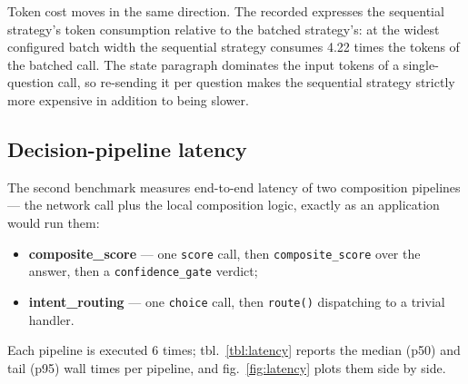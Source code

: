 \documentclass[
  english,
]{article}
\providecommand{\tightlist}{%
  \setlength{\itemsep}{0pt}\setlength{\parskip}{0pt}}
\begin{document}
Token cost moves in the same direction. The recorded
 expresses the sequential strategy's token
consumption relative to the batched strategy's: at the widest configured
batch width the sequential strategy consumes 4.22 times the tokens of
the batched call. The state paragraph dominates the input tokens of a
single-question call, so re-sending it per question makes the sequential
strategy strictly more expensive in addition to being slower.

\subsection{Decision-pipeline latency}\label{decision-pipeline-latency}

The second benchmark measures end-to-end latency of two composition
pipelines --- the network call plus the local composition logic, exactly
as an application would run them:

\begin{itemize}
\tightlist
\item
  \textbf{composite\_score} --- one \texttt{score} call, then
  \texttt{composite\_score} over the answer, then a
  \texttt{confidence\_gate} verdict;
\item
  \textbf{intent\_routing} --- one \texttt{choice} call, then
  \texttt{route()} dispatching to a trivial handler.
\end{itemize}

Each pipeline is executed 6 times; tbl.~\ref{tbl:latency} reports the
median (p50) and tail (p95) wall times per pipeline, and
fig.~\ref{fig:latency} plots them side by side.
\end{document}
